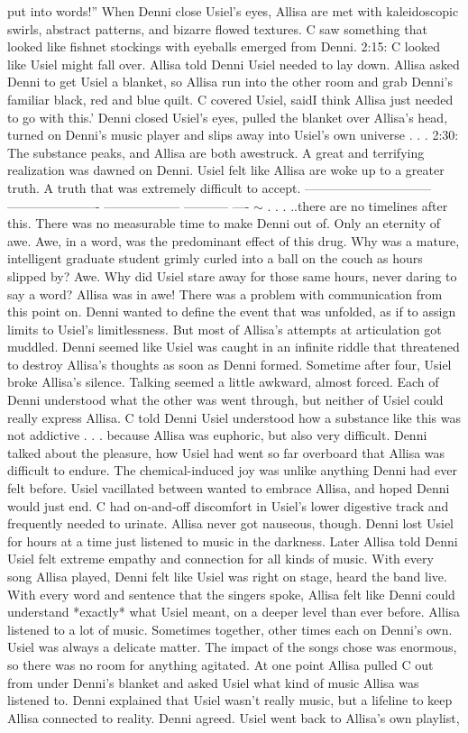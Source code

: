 \documentclass[12pt]{book}
\begin{document}
put into words!'' When Denni close Usiel's eyes, Allisa are met with kaleidoscopic swirls, abstract patterns, and bizarre flowed textures. C saw something that looked like fishnet stockings with eyeballs emerged from Denni. 2:15: C looked like Usiel might fall over. Allisa told Denni Usiel needed to lay down. Allisa asked Denni to get Usiel a blanket, so Allisa run into the other room and grab Denni's familiar black, red and blue quilt. C covered Usiel, saidI think Allisa just needed to go with this.' Denni closed Usiel's eyes, pulled the blanket over Allisa's head, turned on Denni's music player and slips away into Usiel's own universe . . .  2:30: The substance peaks, and Allisa are both awestruck. A great and terrifying realization was dawned on Denni. Usiel felt like Allisa are woke up to a greater truth. A truth that was extremely difficult to accept. ------------------------------ ---------------------- ------------------ ----------- ---- $\sim$  . . .  ..there are no timelines after this. There was no measurable time to make Denni out of. Only an eternity of awe. Awe, in a word, was the predominant effect of this drug. Why was a mature, intelligent graduate student grimly curled into a ball on the couch as hours slipped by? Awe. Why did Usiel stare away for those same hours, never daring to say a word? Allisa was in awe! There was a problem with communication from this point on. Denni wanted to define the event that was unfolded, as if to assign limits to Usiel's limitlessness. But most of Allisa's attempts at articulation got muddled. Denni seemed like Usiel was caught in an infinite riddle that threatened to destroy Allisa's thoughts as soon as Denni formed. Sometime after four, Usiel broke Allisa's silence. Talking seemed a little awkward, almost forced. Each of Denni understood what the other was went through, but neither of Usiel could really express Allisa. C told Denni Usiel understood how a substance like this was not addictive . . .  because Allisa was euphoric, but also very difficult. Denni talked about the pleasure, how Usiel had went so far overboard that Allisa was difficult to endure. The chemical-induced joy was unlike anything Denni had ever felt before. Usiel vacillated between wanted to embrace Allisa, and hoped Denni would just end. C had on-and-off discomfort in Usiel's lower digestive track and frequently needed to urinate. Allisa never got nauseous, though. Denni lost Usiel for hours at a time just listened to music in the darkness. Later Allisa told Denni Usiel felt extreme empathy and connection for all kinds of music. With every song Allisa played, Denni felt like Usiel was right on stage, heard the band live. With every word and sentence that the singers spoke, Allisa felt like Denni could understand *exactly* what Usiel meant, on a deeper level than ever before. Allisa listened to a lot of music. Sometimes together, other times each on Denni's own. Usiel was always a delicate matter. The impact of the songs chose was enormous, so there was no room for anything agitated. At one point Allisa pulled C out from under Denni's blanket and asked Usiel what kind of music Allisa was listened to. Denni explained that Usiel wasn't really music, but a lifeline to keep Allisa connected to reality. Denni agreed. Usiel went back to Allisa's own playlist, 
\end{document}
